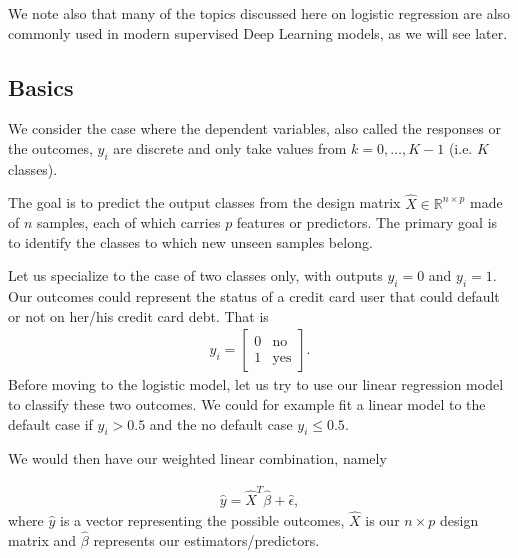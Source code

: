 \documentclass[letterpaper,10pt,english]{sphinxmanual}
\begin{document}
We note also that many of the topics discussed here on logistic
regression are also commonly used in modern supervised Deep Learning
models, as we will see later.


\subsection{Basics}
\label{\detokenize{chapter5:basics}}
We consider the case where the dependent variables, also called the
responses or the outcomes, \(y_i\) are discrete and only take values
from \(k=0,\dots,K-1\) (i.e. \(K\) classes).

The goal is to predict the
output classes from the design matrix \(\hat{X}\in\mathbb{R}^{n\times p}\)
made of \(n\) samples, each of which carries \(p\) features or predictors. The
primary goal is to identify the classes to which new unseen samples
belong.

Let us specialize to the case of two classes only, with outputs
\(y_i=0\) and \(y_i=1\). Our outcomes could represent the status of a
credit card user that could default or not on her/his credit card
debt. That is
\begin{equation*}
\begin{split}
y_i = \begin{bmatrix} 0 & \mathrm{no}\\  1 & \mathrm{yes} \end{bmatrix}.
\end{split}
\end{equation*}
Before moving to the logistic model, let us try to use our linear
regression model to classify these two outcomes. We could for example
fit a linear model to the default case if \(y_i > 0.5\) and the no
default case \(y_i \leq 0.5\).

We would then have our
weighted linear combination, namely




\begin{equation*}
\begin{split}
\begin{equation}
\hat{y} = \hat{X}^T\hat{\beta} +  \hat{\epsilon},
\label{_auto1} \tag{1}
\end{equation}
\end{split}
\end{equation*}
where \(\hat{y}\) is a vector representing the possible outcomes, \(\hat{X}\) is our
\(n\times p\) design matrix and \(\hat{\beta}\) represents our estimators/predictors.
\end{document}

